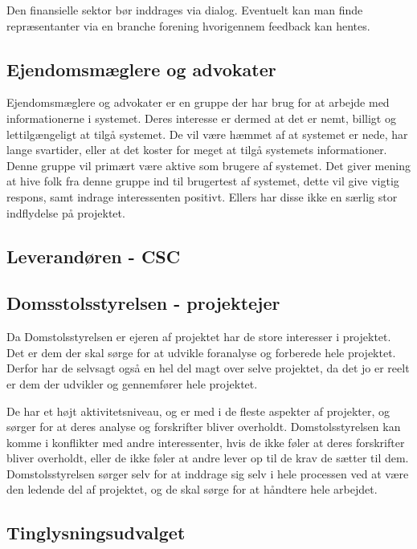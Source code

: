 \documentclass[10pt,a4paper,danish]{article}
\begin{document}
Den finansielle sektor bør inddrages via dialog. Eventuelt kan man finde
repræsentanter via en branche forening hvorigennem feedback kan hentes.

\subsection{Ejendomsmæglere og advokater}

Ejendomsmæglere og advokater er en gruppe der har brug for at arbejde med
informationerne i systemet.
Deres interesse er dermed at det er nemt, billigt og lettilgængeligt at tilgå
systemet. De vil være hæmmet af at systemet er nede, har lange svartider, eller
at det koster for meget at tilgå systemets informationer.
Denne gruppe vil primært være aktive som brugere af systemet.
Det giver mening at hive folk fra denne gruppe ind til brugertest af systemet,
dette vil give vigtig respons, samt indrage interessenten positivt.
Ellers har disse ikke en særlig stor indflydelse på projektet.

\subsection{Leverandøren - CSC}


\subsection{Domsstolsstyrelsen - projektejer}
Da Domstolsstyrelsen er ejeren af projektet har de store interesser i projektet. Det er dem der skal sørge for at udvikle foranalyse og forberede hele projektet. Derfor har de selvsagt også en hel del magt over selve projektet, da det jo er reelt er dem der udvikler og gennemfører hele projektet.

De har et højt aktivitetsniveau, og er med i de fleste aspekter af projekter, og sørger for at deres analyse og forskrifter bliver overholdt. Domstolsstyrelsen kan komme i konflikter med andre interessenter, hvis de ikke føler at deres forskrifter bliver overholdt, eller de ikke føler at andre lever op til de krav de sætter til dem. Domstolsstyrelsen sørger selv for at inddrage sig selv i hele processen ved at være den ledende del af projektet, og de skal sørge for at håndtere hele arbejdet.


\subsection{Tinglysningsudvalget}
\end{document}
